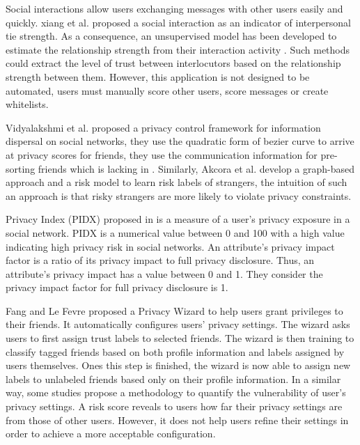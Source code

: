 Social interactions allow users exchanging messages with other users easily and quickly.
	xiang et al. \cite{xiang_modeling_2010} proposed a social interaction as an indicator of interpersonal tie strength.
As a consequence,
	an unsupervised model has been developed to estimate the relationship strength from their interaction activity \cite{xiang_modeling_2010}.
Such methods could extract the level of trust between interlocutors based on the relationship strength between them.
However,
	this application is not designed to be automated,
	users must manually score other users, score messages or create whitelists.

Vidyalakshmi et al. \cite{b.s._privacy_2015} proposed a privacy control framework for information dispersal on social networks,
	they use the quadratic form of bezier curve to arrive at privacy scores for friends,
	they use the communication information for pre-sorting friends which is lacking in \cite{vidyalakshmi_privacy_2015}.
Similarly,
	Akcora et al. \cite{akcora_risks_2012} develop a graph-based approach and a risk model to learn risk labels of strangers,
	the intuition of such an approach is that risky strangers are more likely to violate privacy constraints.

Privacy Index (PIDX) proposed in \cite{nepali_sonet_2013} is a measure of a user’s privacy exposure in a social network.
PIDX is a numerical value between 0 and 100 with a high value indicating high privacy risk in social networks.
An attribute’s privacy impact factor is a ratio of its privacy impact to full privacy disclosure.
Thus,
	an attribute’s privacy impact has a value between 0 and 1.
They consider the privacy impact factor for full privacy disclosure is 1.

Fang and Le Fevre \cite{fang_privacy_2010} proposed a Privacy Wizard to help users grant privileges to their friends.
It automatically configures users' privacy settings.
The wizard asks users to first assign trust labels to selected friends.
The wizard is then training to classify tagged friends based on both profile information and labels assigned by users themselves.
Ones this step is finished,
	the wizard is now able to assign new labels to unlabeled friends based only on their profile information.
In a similar way,
	some studies \cite{maximilien_privacyasaservice_2009} propose a methodology to quantify the vulnerability of user’s privacy settings.
A risk score reveals to users how far their privacy settings are from those of other users.
However,
	it does not help users refine their settings in order to achieve a more acceptable configuration.

